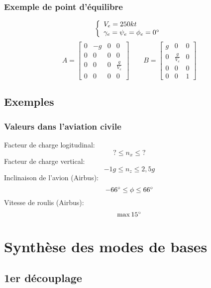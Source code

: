 \documentclass[footheight=2em]{beamer}
\begin{document}
\begin{frame}
    \frametitle{Exemple de point d'équilibre}\pause{}
    \[
    \left \{
    \begin{array}{l}
        V_e = 250 kt \\
        \gamma_e = \psi_e = \phi_e = 0 \degree
    \end{array}
    \right.
    \]
    \[
    A =
    \left[
    \begin{array}{cccc}
        0 & -g & 0 & 0 \\
        0 & 0 & 0 & 0 \\
        0 & 0 & 0 & \frac{g}{V_e} \\
        0 & 0 & 0 & 0
    \end{array}
    \right]
    \qquad
    B =
    \left[
    \begin{array}{cccc}
        g & 0 & 0 \\
        0 & \frac{g}{V_e} & 0 \\
        0 & 0 & 0 \\
        0 & 0 & 1
    \end{array}
    \right]
    \]
\end{frame}

\subsection{Exemples}

\begin{frame}
    \frametitle{Valeurs dans l'aviation civile}\pause{}
    Facteur de charge logitudinal:
    \[
    ? \le n_x \le ?
    \]\pause{}
    Facteur de charge vertical:
    \[
    -1g \le n_z \le 2,5g
    \]\pause{}
    Inclinaison de l'avion (Airbus):
    \[
    -66\degree \le \phi \le 66\degree
    \] \pause{}
    Vitesse de roulis (Airbus):
    \[
    \max 15\degree
    \]
\end{frame}


\section{Synthèse des modes de bases}

\subsection{1er découplage}
\end{document}
